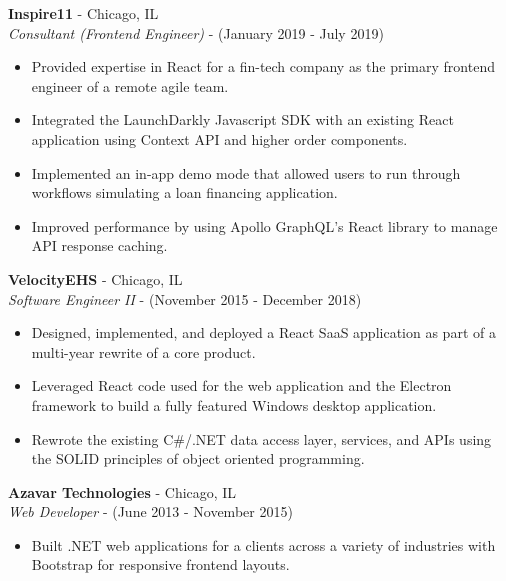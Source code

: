 \documentclass[11pt]{article}
\begin{document}
\begin{paracol}{2}
\noindent \textbf{Inspire11} - Chicago, IL \\
\textit{Consultant (Frontend Engineer)} - {\footnotesize{(January 2019 - July 2019)}} 
\begin{itemize}
    \item Provided expertise in React for a fin-tech company as the primary frontend engineer of a remote agile team.
    \item Integrated the LaunchDarkly Javascript SDK with an existing React application using Context API and higher order components.
    \item Implemented an in-app demo mode that allowed users to run through workflows simulating a loan financing application.
    \item Improved performance by using Apollo GraphQL's React library to manage API response caching.
\end{itemize} 

\noindent \textbf{VelocityEHS} - Chicago, IL \\
\textit{Software Engineer II} - {\footnotesize{(November 2015 - December 2018)}}
\begin{itemize}
    \item Designed, implemented, and deployed a React SaaS application as part of a multi-year rewrite of a core product.
    \item Leveraged React code used for the web application and the Electron framework to build a fully featured Windows desktop application.
    \item Rewrote the existing C\#/.NET data access layer, services, and APIs using the SOLID principles of object oriented programming.
\end{itemize} 

\noindent \textbf{Azavar Technologies} - Chicago, IL \\
\textit{Web Developer} - {\footnotesize(June 2013 - November 2015)}
\begin{itemize}
    \item Built .NET web applications for a clients across a variety of industries with Bootstrap for responsive frontend layouts.
\end{itemize}
    
\end{paracol}
\end{document}
